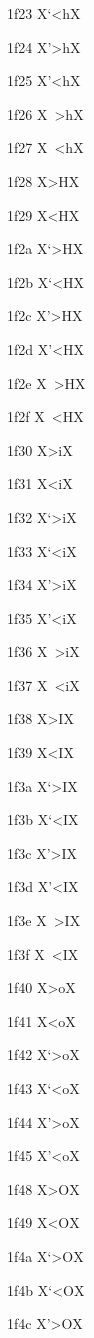 \documentclass[11pt]{article}
\begin{document}
1f23 X{\textgreek{`<h}}X

1f24 X{\textgreek{'>h}}X

1f25 X{\textgreek{'<h}}X

1f26 X{\textgreek{~>h}}X

1f27 X{\textgreek{~<h}}X

1f28 X{\textgreek{>H}}X

1f29 X{\textgreek{<H}}X

1f2a X{\textgreek{`>H}}X

1f2b X{\textgreek{`<H}}X

1f2c X{\textgreek{'>H}}X

1f2d X{\textgreek{'<H}}X

1f2e X{\textgreek{~>H}}X

1f2f X{\textgreek{~<H}}X

1f30 X{\textgreek{>i}}X

1f31 X{\textgreek{<i}}X

1f32 X{\textgreek{`>i}}X

1f33 X{\textgreek{`<i}}X

1f34 X{\textgreek{'>i}}X

1f35 X{\textgreek{'<i}}X

1f36 X{\textgreek{~>i}}X

1f37 X{\textgreek{~<i}}X

1f38 X{\textgreek{>I}}X

1f39 X{\textgreek{<I}}X

1f3a X{\textgreek{`>I}}X

1f3b X{\textgreek{`<I}}X

1f3c X{\textgreek{'>I}}X

1f3d X{\textgreek{'<I}}X

1f3e X{\textgreek{~>I}}X

1f3f X{\textgreek{~<I}}X

1f40 X{\textgreek{>o}}X

1f41 X{\textgreek{<o}}X

1f42 X{\textgreek{`>o}}X

1f43 X{\textgreek{`<o}}X

1f44 X{\textgreek{'>o}}X

1f45 X{\textgreek{'<o}}X

1f48 X{\textgreek{>O}}X

1f49 X{\textgreek{<O}}X

1f4a X{\textgreek{`>O}}X

1f4b X{\textgreek{`<O}}X

1f4c X{\textgreek{'>O}}X
\end{document}
